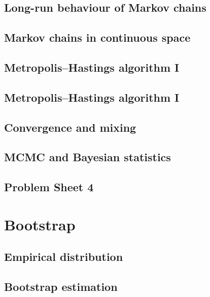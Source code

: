 \documentclass[
  letterpaper,
  DIV=11,
  numbers=noendperiod]{scrreprt}
\theoremstyle{definition}
\theoremstyle{definition}
\theoremstyle{remark}
\begin{document}
\chapter{Long-run behaviour of Markov
chains}\label{long-run-behaviour-of-markov-chains}

\chapter{Markov chains in continuous
space}\label{markov-chains-in-continuous-space}

\chapter{Metropolis--Hastings algorithm
I}\label{metropolishastings-algorithm-i}

\chapter{Metropolis--Hastings algorithm
I}\label{metropolishastings-algorithm-i-1}

\chapter{Convergence and mixing}\label{convergence-and-mixing}

\chapter{MCMC and Bayesian
statistics}\label{mcmc-and-bayesian-statistics}

\chapter*{Problem Sheet 4}\label{problem-sheet-4}


\part{Bootstrap}

\chapter{Empirical distribution}\label{empirical-distribution}

\chapter{Bootstrap estimation}\label{bootstrap-estimation}
\end{document}
